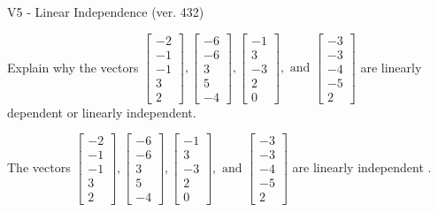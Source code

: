 \begin{exercise}
  \begin{exerciseTitle}V5 - Linear Independence (ver. 432)\end{exerciseTitle}
  \begin{exerciseStatement}
    Explain why the vectors \(\left[\begin{array}{r}
-2 \\
-1 \\
-1 \\
3 \\
2
\end{array}\right] , \left[\begin{array}{r}
-6 \\
-6 \\
3 \\
5 \\
-4
\end{array}\right] , \left[\begin{array}{r}
-1 \\
3 \\
-3 \\
2 \\
0
\end{array}\right] , \text{ and } \left[\begin{array}{r}
-3 \\
-3 \\
-4 \\
-5 \\
2
\end{array}\right]\) are linearly dependent or linearly independent.	


  \end{exerciseStatement}
  \begin{exerciseAnswer}
   The vectors \(\left[\begin{array}{r}
-2 \\
-1 \\
-1 \\
3 \\
2
\end{array}\right] , \left[\begin{array}{r}
-6 \\
-6 \\
3 \\
5 \\
-4
\end{array}\right] , \left[\begin{array}{r}
-1 \\
3 \\
-3 \\
2 \\
0
\end{array}\right] , \text{ and } \left[\begin{array}{r}
-3 \\
-3 \\
-4 \\
-5 \\
2
\end{array}\right]\) are 
  	 linearly independent  .
  


  \end{exerciseAnswer}
\end{exercise}